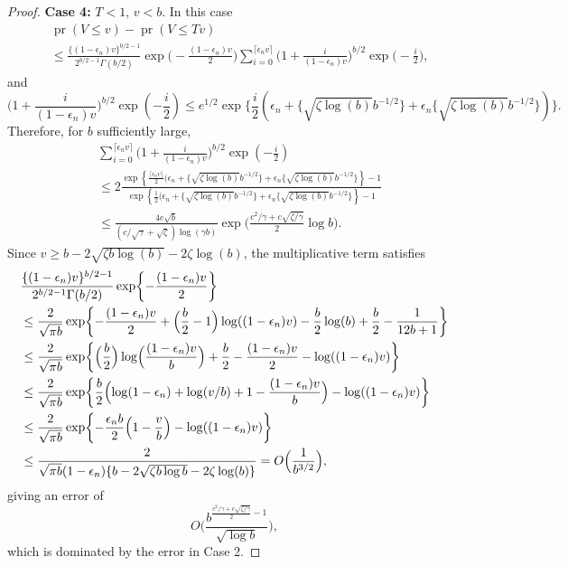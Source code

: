 \documentclass[10pt, reqno]{amsart}
\numberwithin{equation}{section}
\newcommand{\pr}{\mathop{\mathrm{pr}}}
\begin{document}
\begin{appendix}
\begin{proof}
	\noindent \textbf{Case 4:} $T < 1$, $v < b$. In this case 
	\begin{align*}
		&\pr( V \leq v) - \pr(V \leq Tv) \\
		&\leq \frac{\{(1 -\epsilon_n)v\}^{b/2-1}}{2^{b/2 -1}\Gamma(b/2)} \exp\biggl( -\frac{ (1 -\epsilon_n)v }{2} \biggr) \sum^{ \lceil \epsilon_n v \rceil}_{  i = 0}  \biggl(1+ \frac{i}{(1 -\epsilon_n)v} \biggr)^{b/2} \exp\biggl(- \frac{i}{2} \biggr),
	\end{align*}
	and
	\[
	\biggl(1+ \frac{i}{(1 -\epsilon_n)v} \biggr)^{b/2} \exp\left(- \frac{i}{2} \right) \leq e^{1/2}\exp\biggl\{\frac{i}{2} (\epsilon_n + \{\sqrt{\zeta\log(b)}b^{-1/2}\} + \epsilon_n\{\sqrt{\zeta\log(b)}b^{-1/2}\})\biggr\}.
	\]
	Therefore,  for $b$ sufficiently large,
	\begin{align*}
		&\sum^{ \lceil \epsilon_n v \rceil}_{  i = 0}  \biggl(1+ \frac{i}{(1 -\epsilon_n)v} \biggr)^{b/2} \exp\left(- \frac{i}{2} \right) \\
		&\leq 2 \frac{  \exp\left\{ \frac{\lceil \epsilon_n v \rceil}{2} (\epsilon_n + \{\sqrt{\zeta\log(b)}b^{-1/2}\} + \epsilon_n\{\sqrt{\zeta\log(b)}b^{-1/2}\}  \right\} -1}{\exp\left\{ \frac{1}{2} (\epsilon_n + \{\sqrt{\zeta\log(b)}b^{-1/2}\} + \epsilon_n\{\sqrt{\zeta\log(b)}b^{-1/2}\} \right\} - 1} \\
		&\leq \frac{4e\sqrt{b}}{( c/\sqrt{\gamma} +\sqrt{\zeta})\log(\gamma b)} \exp\biggl( \frac{c^2/\gamma + c\sqrt{\zeta/\gamma} }{2} \log b \biggr).
	\end{align*}
	Since $v \geq b - 2\sqrt{\zeta b\log(b)} - 2\zeta\log(b)$, the multiplicative term satisfies
	\begin{align*}
		&\frac{\{(1 -\epsilon_n)v\}^{b/2-1}}{2^{b/2 -1}\Gamma(b/2)} \exp\biggl\{-\frac{ (1 -\epsilon_n)v }{2} \biggr\} \\
		&\leq  \frac{2}{\sqrt{\pi b}} \exp\biggl\{-\frac{(1 - \epsilon_n)v}{2} + \Bigl(\frac{b}{2} - 1\Bigr) \log( (1- \epsilon_n)v ) - \frac{b}{2}\log(b) + \frac{b}{2} - \frac{1}{12b + 1}  \biggr\}\\
		&\leq \frac{2}{\sqrt{\pi b}} \exp\biggl\{ \Bigl(\frac{b}{2}\Bigr) \log\Bigl(\frac{(1- \epsilon_n)v}{b} \Bigr) +  \frac{b}{2} -\frac{(1 - \epsilon_n)v}{2} - \log((1-\epsilon_n)v) \biggr\}\\
		&\leq \frac{2}{\sqrt{\pi b}} \exp\biggl\{ \frac{b}{2}\Bigl( \log(1 - \epsilon_n) + \log(v/b) + 1 - \frac{(1-\epsilon_n)v}{b}\Bigr) - \log( (1- \epsilon_n)v )   \biggr\}\\
		&\leq\frac{2}{\sqrt{\pi b}} \exp\biggl\{ -\frac{\epsilon_n b}{2} \Bigl(1 - \frac{v}{b} \Bigr) - \log( (1- \epsilon_n)v )  \biggr\}\\
		&\leq \frac{2}{\sqrt{\pi b}(1-\epsilon_n)\{b - 2\sqrt{\zeta b\log b} - 2\zeta\log(b)\} }  = O\Bigl( \frac{1}{b^{3/2}} \Bigr),
	\end{align*}
	giving an error of
	\[
	O\biggl( \frac{b^{\frac{c^2/\gamma + c\sqrt{\zeta/\gamma} }{2} - 1}}{\sqrt{\log b}}  \biggr),
	\]
	which is dominated by the error in Case 2.
\end{proof}


\end{appendix}
\end{document}
